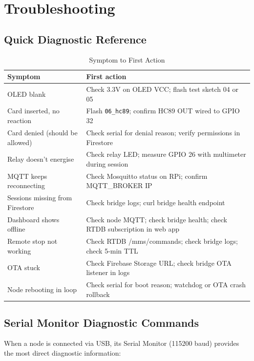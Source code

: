 \chapter{Troubleshooting}
\label{ch:troubleshooting}

\section{Quick Diagnostic Reference}

\begin{table}[H]
\centering
\caption{Symptom to First Action}
\begin{tabular}{L{5.5cm}L{9cm}}
\toprule
\textbf{Symptom} & \textbf{First action} \\
\midrule
OLED blank & Check 3.3V on OLED VCC; flash test sketch 04 or 05 \\
Card inserted, no reaction & Flash \texttt{06\_hc89}; confirm HC89 OUT wired to GPIO 32 \\
Card denied (should be allowed) & Check serial for denial reason; verify permissions in Firestore \\
Relay doesn't energise & Check relay LED; measure GPIO 26 with multimeter during session \\
MQTT keeps reconnecting & Check Mosquitto status on RPi; confirm MQTT\_BROKER IP \\
Sessions missing from Firestore & Check bridge logs; curl bridge health endpoint \\
Dashboard shows offline & Check node MQTT; check bridge health; check RTDB subscription in web app \\
Remote stop not working & Check RTDB /mms/commands; check bridge logs; check 5-min TTL \\
OTA stuck & Check Firebase Storage URL; check bridge OTA listener in logs \\
Node rebooting in loop & Check serial for boot reason; watchdog or OTA crash rollback \\
\bottomrule
\end{tabular}
\end{table}

\section{Serial Monitor Diagnostic Commands}

When a node is connected via USB, its Serial Monitor (115200 baud) provides the most direct diagnostic information:


